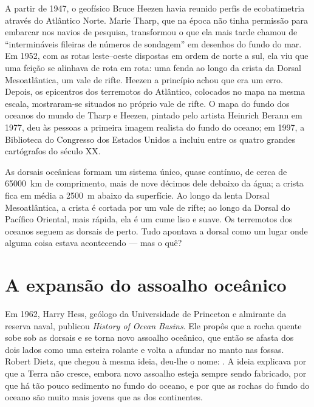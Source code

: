 \begin{history}
A partir de 1947, o geofísico Bruce Heezen havia reunido perfis de
ecobatimetria através do Atlântico Norte. Marie Tharp, que na época não
tinha permissão para embarcar nos navios de pesquisa, transformou o que ela
mais tarde chamou de ``intermináveis fileiras de números de sondagem'' em
desenhos do fundo do mar. Em 1952, com as rotas leste--oeste dispostas em
ordem de norte a sul, ela viu que uma feição se alinhava de rota em rota:
uma fenda ao longo da crista da Dorsal Mesoatlântica, um vale de rifte.
Heezen a princípio achou que era um erro. Depois, os epicentros dos
terremotos do Atlântico, colocados no mapa na mesma escala, mostraram-se
situados no próprio vale de rifte. O mapa do fundo dos oceanos do mundo de
Tharp e Heezen, pintado pelo artista Heinrich Berann em 1977, deu às pessoas
a primeira imagem realista do fundo do oceano; em 1997, a Biblioteca do
Congresso dos Estados Unidos a incluiu entre os quatro grandes cartógrafos
do século XX.
\end{history}

As dorsais oceânicas formam um sistema único, quase contínuo, de cerca de
\qty{65000}{km} de comprimento, mais de nove décimos dele debaixo da água; a
crista fica em média a \qty{2500}{m} abaixo da superfície. Ao longo da lenta
Dorsal Mesoatlântica, a crista é cortada por um vale de rifte; ao longo da
Dorsal do Pacífico Oriental, mais rápida, ela é um cume liso e suave. Os
terremotos dos oceanos seguem as dorsais de perto. Tudo apontava a dorsal
como um lugar onde alguma coisa estava acontecendo --- mas o quê?

\section{A expansão do assoalho oceânico}

\begin{history}
Em 1962, Harry Hess, geólogo da Universidade de Princeton e almirante da
reserva naval, publicou \emph{History of Ocean Basins}. Ele propôs que a
rocha quente sobe sob as dorsais e se torna novo assoalho oceânico, que
então se afasta dos dois lados como uma esteira rolante e volta a afundar no
manto nas fossas. Robert Dietz, que chegou à mesma ideia, deu-lhe o nome:
. A ideia explicava por que a Terra não cresce,
embora novo assoalho esteja sempre sendo fabricado, por que há tão pouco
sedimento no fundo do oceano, e por que as rochas do fundo do oceano são
muito mais jovens que as dos continentes.
\end{history}

